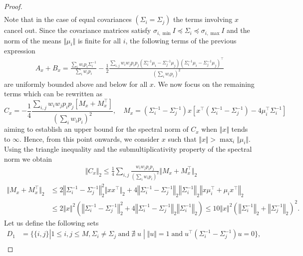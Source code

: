\begin{proof}
\begin{align*}
\end{align*}
Note that in the case of equal covariances $(\Sigma_i = \Sigma_j)$ the terms involving $x$ cancel out. Since the covariance matrices satisfy $\sigma_{i,\min} I\preccurlyeq\Sigma_i\preccurlyeq \sigma_{i,\max} I$ and the norm of the means $\Vert \mu_i\Vert$ is finite for all $i$, the following terms of the previous expression 
\begin{align*}
    A_x + B_x = \frac{\sum_i w_i p_i \Sigma_i^{-1}}{\sum_i w_i p_i}-\frac{1}{2 }\frac{\sum_{i,j} w_iw_j p_i p_j (\Sigma_i^{-1}\mu_i-\Sigma_j^{-1}\mu_j)(\Sigma_i^{-1}\mu_i-\Sigma_j^{-1}\mu_j)^\intercal}{(\sum_i w_i p_i)^2}
\end{align*}
are uniformly bounded above and below for all $x$.
We now focus on the remaining terms which can be rewritten as
\begin{equation*}
     C_x = -\frac{1}{4}\frac{\sum_{i,j} w_iw_j p_i p_j [M_x + M_x^{\intercal}]}{(\sum_i w_i p_i)^2}, \quad M_x = (\Sigma_i^{-1}-\Sigma_j^{-1})x\left[x^\intercal(\Sigma_i^{-1}-\Sigma_j^{-1}) -4 \mu_i^{\intercal}\Sigma_i^{-1}\right]
\end{equation*}
aiming to establish an upper bound for the spectral norm of $C_x$ when $\Vert x\Vert$ tends to $\infty$. Hence, from this point onwards, we consider $x$ such that $\Vert x \Vert>\max_i{\Vert \mu_i \Vert}$.
Using the triangle inequality and the submultiplicativity property of the spectral norm we obtain
\begin{align}
    &\quad\quad\quad\quad\quad\Vert C_x\Vert_2 \leq \frac{1}{4}\sum_{i, j}\frac{ w_iw_j p_i p_j }{(\sum_i w_i p_i)^2}\Vert M_x + M_x^{\intercal} \Vert_2 \label{eq:sum_spectral_norm}\\
    \Vert M_x + M_x^{\intercal} \Vert_2 &\leq  2\left\Vert\Sigma_i^{-1}-\Sigma_j^{-1}\right\Vert_2^2 \Vert x x^\intercal\Vert_2 + 4 \left\Vert\Sigma_i^{-1}-\Sigma_j^{-1}\right\Vert_2
    \left\Vert\Sigma_i^{-1}\right\Vert_2\left\Vert x\mu_i^{\intercal} + \mu_ix^{\intercal}\right\Vert_2 \nonumber
    \\&\leq 2\Vert x\Vert^2\left(\left\Vert\Sigma_i^{-1}-\Sigma_j^{-1}\right\Vert_2^2 + 4 \left\Vert\Sigma_i^{-1}-\Sigma_j^{-1}\right\Vert_2
    \left\Vert\Sigma_i^{-1}\right\Vert_2\right) \leq 10\Vert x\Vert^2\left(\left\Vert\Sigma_i^{-1}\right\Vert_2+ \left\Vert\Sigma_j^{-1}\right\Vert_2\right)^2.\nonumber
\end{align}
Let us define the following sets
\begin{align*}
   D_1 &= \{\{i, j\}|1\leq i, j\leq M, \Sigma_i\neq \Sigma_j \;\text{and}\; \nexists\; u\; |\;\Vert u\Vert = 1\;\text{and}\; u^\intercal\left(\Sigma_i^{-1}-\Sigma_j^{-1}\right)u = 0\},\\

\end{align*}
\end{proof}
